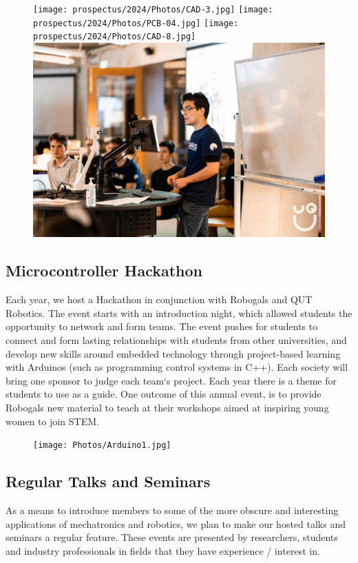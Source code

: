 \documentclass[a4paper,12pt]{report}
\begin{document}
\begin{figure}[H]
    \centering
    \texttt{[image: prospectus/2024/Photos/CAD-3.jpg]}
    \texttt{[image: prospectus/2024/Photos/PCB-04.jpg]}
    \texttt{[image: prospectus/2024/Photos/CAD-8.jpg]}
    \includegraphics[width=0.42\linewidth]{prospectus/2023/Photos/Hackathon.jpg}
\end{figure}


\newpage

\subsection*{Microcontroller Hackathon}
Each year, we host a Hackathon in conjunction with Robogals and QUT Robotics.
The event starts with an introduction night, which allowed students the opportunity to network and form teams.
The event pushes for students to connect and form lasting relationships with students from other universities, and develop new skills around embedded technology through project-based learning with Arduinos (such as programming control systems in C++).
Each society will bring one sponsor to judge each team`s project. Each year there is a theme for students to use as a guide.
One outcome of this annual event, is to provide Robogals new material to teach at their workshops aimed at inspiring young women to join STEM.

\begin{figure}[H]
    \centering
    \texttt{[image: Photos/Arduino1.jpg]}
\end{figure}


\subsection*{Regular Talks and Seminars} 
As a means to introduce members to some of the more obscure and interesting applications of mechatronics and robotics, we plan to make our hosted talks and seminars a regular feature.
These events are presented by researchers, students and industry professionals in fields that they have experience / interest in.
\end{document}
